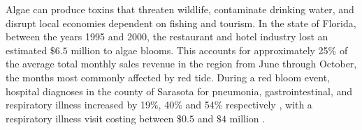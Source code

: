 Algae can produce toxins that threaten wildlife, contaminate drinking water, and disrupt local economies dependent on fishing and tourism.
In the state of Florida, between the years 1995 and 2000, the restaurant and hotel industry lost an estimated $\$6.5$ million to algae blooms.
This accounts for approximately 25\% of the average total monthly sales revenue in the region from June through October, the months most commonly affected by red tide\cite{PDFEconomicImpacts}.
During a red bloom event, hospital diagnoses in the county of Sarasota for pneumonia, gastrointestinal, and respiratory illness increased by 19\%, 40\% and 54\% respectively \cite{chengCharacterizationMarineAerosol2005, kirkpatrickGastrointestinalEmergencyRoom2010}, with a respiratory illness visit costing between $\$0.5$ and $\$4$ million \cite{hoaglandCostsRespiratoryIllnesses2009}. 
